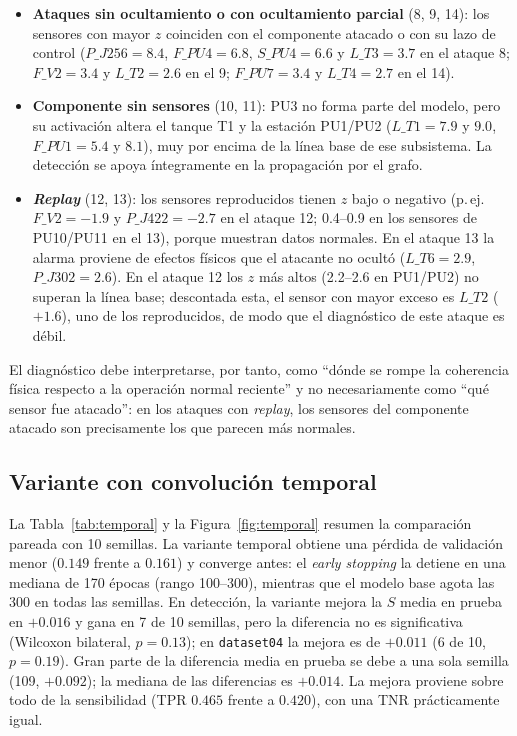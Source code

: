 \documentclass[11pt,a4paper]{article}
\begin{document}
\begin{itemize}[leftmargin=*]
\item \textbf{Ataques sin ocultamiento o con ocultamiento parcial} (8, 9, 14): los
  sensores con mayor $z$ coinciden con el componente atacado o con su lazo de control
  ($P\_J256=8.4$, $F\_PU4=6.8$, $S\_PU4=6.6$ y $L\_T3=3.7$ en el ataque 8;
  $F\_V2=3.4$ y $L\_T2=2.6$ en el 9; $F\_PU7=3.4$ y $L\_T4=2.7$ en el 14).
\item \textbf{Componente sin sensores} (10, 11): PU3 no forma parte del modelo, pero
  su activación altera el tanque T1 y la estación PU1/PU2 ($L\_T1=7.9$ y $9.0$,
  $F\_PU1=5.4$ y $8.1$), muy por encima de la línea base de ese subsistema. La
  detección se apoya íntegramente en la propagación por el grafo.
\item \textbf{\emph{Replay}} (12, 13): los sensores reproducidos tienen $z$ bajo o
  negativo (p.\,ej.\ $F\_V2=-1.9$ y $P\_J422=-2.7$ en el ataque 12; 0.4--0.9 en los
  sensores de PU10/PU11 en el 13), porque muestran datos normales. En el ataque 13 la
  alarma proviene de efectos físicos que el atacante no ocultó ($L\_T6=2.9$,
  $P\_J302=2.6$). En el ataque 12 los $z$ más altos (2.2--2.6 en PU1/PU2) no superan
  la línea base; descontada esta, el sensor con mayor exceso es $L\_T2$ ($+1.6$), uno
  de los reproducidos, de modo que el diagnóstico de este ataque es débil.
\end{itemize}

El diagnóstico debe interpretarse, por tanto, como ``dónde se rompe la coherencia
física respecto a la operación normal reciente'' y no necesariamente como ``qué
sensor fue atacado'': en los ataques con \emph{replay}, los sensores del componente
atacado son precisamente los que parecen más normales.

\subsection{Variante con convolución temporal}

La Tabla~\ref{tab:temporal} y la Figura~\ref{fig:temporal} resumen la comparación
pareada con 10 semillas. La variante temporal obtiene una pérdida de validación menor
($0.149$ frente a $0.161$) y converge antes: el \emph{early stopping} la detiene en una
mediana de 170 épocas (rango 100--300), mientras que el modelo base agota las 300 en
todas las semillas. En detección, la variante mejora la $S$ media en prueba en
$+0.016$ y gana en 7 de 10 semillas, pero la diferencia no es significativa (Wilcoxon
bilateral, $p=0.13$); en \texttt{dataset04} la mejora es de $+0.011$ (6 de 10,
$p=0.19$). Gran parte de la diferencia media en prueba se debe a una sola semilla
(109, $+0.092$); la mediana de las diferencias es $+0.014$. La mejora proviene sobre
todo de la sensibilidad (TPR $0.465$ frente a $0.420$), con una TNR prácticamente igual.
\end{document}
